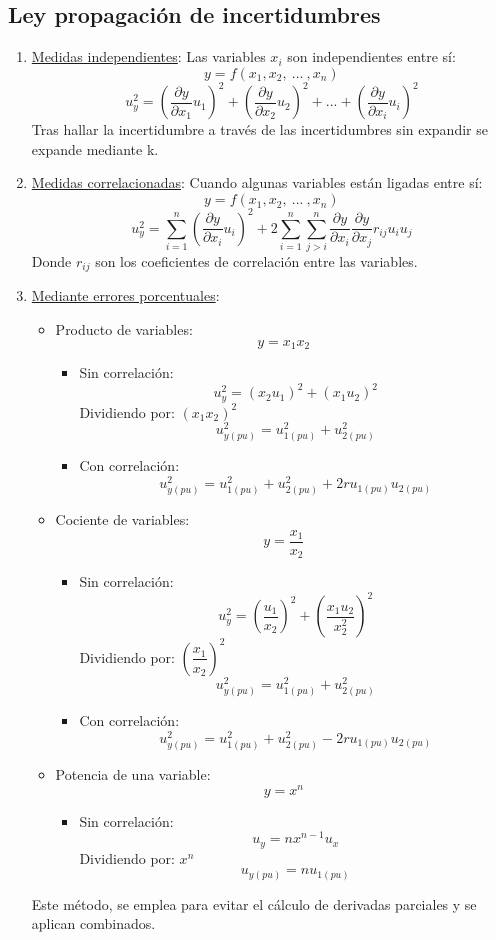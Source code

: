 \subsection{Ley propagación de incertidumbres}
\begin{enumerate}
	\item \underline{Medidas independientes}: Las variables $x_i$ son independientes entre sí:
	\[y=f(x_1,x_2,\ ... \ ,x_n)\]
	\[u^2_y=  \left({\frac{\partial y}{\partial x_1}u_1}\right)^2 +
	\left({\frac{\partial y}{\partial x_2} u_2}\right)^2 + ... +
	\left({\frac{\partial y}{\partial x_i}u_i}\right)^2\]
	Tras hallar la incertidumbre a través de las incertidumbres sin expandir se expande mediante k.
	\item \underline{Medidas correlacionadas}: Cuando algunas variables están ligadas entre sí:
	\[y=f(x_1,x_2,\ ... \ ,x_n)\]
	\[u^2_y=   \sum_{i=1}^{n} \left({\frac{\partial y}{\partial x_i}u_i}\right)^2 + 2 \sum_{i=1}^{n} \sum_{j>i}^{n} \frac{\partial y}{\partial x_i} \frac{\partial y}{\partial x_j} r_{ij} u_i u_j
	\]
	Donde $r_{ij}$ son los coeficientes de correlación entre las variables.
	\item \underline{Mediante errores porcentuales}:
		\begin{itemize}
			\item Producto de variables:
			\[y= x_1 x_2\]
			\begin{itemize}		
				\item Sin correlación:
				\[u_y^2=  ({x_2 u_1})^2 +({x_1 u_2})^2\]
				Dividiendo por: $(x_1 x_2)^2$
				\[u_{y(pu)}^2=   u_{1(pu)}^2 +u_{2(pu)}^2\]
				\item Con correlación:
				\[u_{y(pu)}^2=   u_{1(pu)}^2 +u_{2(pu)}^2+2ru_{1(pu)}u_{2(pu)}\]
			\end{itemize}
			\item Cociente de variables:
			\[y= \frac{x_1} {x_2}\]
			\begin{itemize}
				\item Sin correlación:
				\[u_y^2=  \left({\frac{u_1}{x_2}}\right)^2 +\left({\frac {x_1 u_2}{x_2^2}}\right)^2\]
				Dividiendo por: $\left({\dfrac{x_1}{x_2}}\right)^2$
				\[u_{y(pu)}^2=   u_{1(pu)}^2 +u_{2(pu)}^2\]
				\item Con correlación:
				\[u_{y(pu)}^2=   u_{1(pu)}^2 +u_{2(pu)}^2-2ru_{1(pu)}u_{2(pu)}\]
			\end{itemize}
			\item Potencia de una variable:
			\[y= x^n\]
			\begin{itemize}
				\item Sin correlación:
					\[u_y=n x^{n-1}u_x\]
				Dividiendo por: $ x^{n}$
				\[u_{y(pu)}=  n u_{1(pu)}\]

			\end{itemize}
		\end{itemize}
		Este método, se emplea para evitar el cálculo de derivadas parciales y se aplican combinados.
\end{enumerate}
